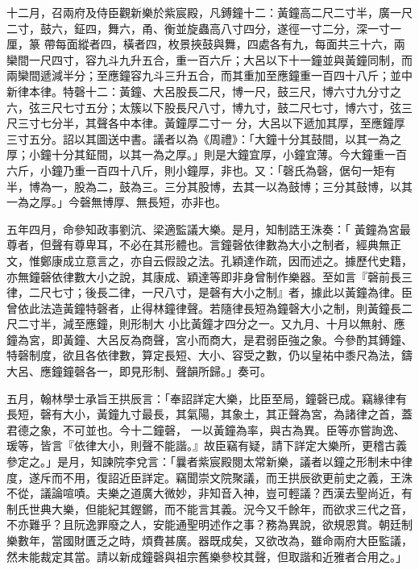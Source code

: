 \begin{pinyinscope}
 十二月，召兩府及侍臣觀新樂於紫宸殿，凡鎛鐘十二：黃鐘高二尺二寸半，廣一尺二寸，鼓六，鉦四，舞六，甬、衡並旋蟲高八寸四分，遂徑一寸二分，深一寸一厘，篆
 帶每面縱者四，橫者四，枚景挾鼓與舞，四處各有九，每面共三十六，兩欒間一尺四寸，容九斗九升五合，重一百六斤；大呂以下十一鐘並與黃鐘同制，而兩欒間遞減半分；至應鐘容九斗三升五合，而其重加至應鐘重一百四十八斤；並中新律本律。特磬十二：黃鐘、大呂股長二尺，博一尺，鼓三尺，博六寸九分寸之六，弦三尺七寸五分；太簇以下股長尺八寸，博九寸，鼓二尺七寸，博六寸，弦三尺三寸七分半，其聲各中本律。黃鐘厚二寸一
 分，大呂以下遞加其厚，至應鐘厚三寸五分。詔以其圖送中書。議者以為《周禮》：「大鐘十分其鼓間，以其一為之厚；小鐘十分其鉦間，以其一為之厚。」則是大鐘宜厚，小鐘宜薄。今大鐘重一百六斤，小鐘乃重一百四十八斤，則小鐘厚，非也。又：「磬氏為磬，倨句一矩有半，博為一，股為二，鼓為三。三分其股博，去其一以為鼓博；三分其鼓博，以其一為之厚。」今磬無博厚、無長短，亦非也。



 五年四月，命參知政事劉沆、梁適監議大樂。是月，知制誥王洙奏：「
 黃鐘為宮最尊者，但聲有尊卑耳，不必在其形體也。言鐘磬依律數為大小之制者，經典無正文，惟鄭康成立意言之，亦自云假設之法。孔穎達作疏，因而述之。據歷代史籍，亦無鐘磬依律數大小之說，其康成、穎達等即非身曾制作樂器。至如言『磬前長三律，二尺七寸；後長二律，一尺八寸，是磬有大小之制』者，據此以黃鐘為律。臣曾依此法造黃鐘特磬者，止得林鐘律聲。若隨律長短為鐘磬大小之制，則黃鐘長二尺二寸半，減至應鐘，則形制大
 小比黃鐘才四分之一。又九月、十月以無射、應鐘為宮，即黃鐘、大呂反為商聲，宮小而商大，是君弱臣強之象。今參酌其鎛鐘、特磬制度，欲且各依律數，算定長短、大小、容受之數，仍以皇祐中黍尺為法，鑄大呂、應鐘鐘磬各一，即見形制、聲韻所歸。」奏可。



 五月，翰林學士承旨王拱辰言：「奉詔詳定大樂，比臣至局，鐘磬已成。竊緣律有長短，磬有大小，黃鐘九寸最長，其氣陽，其象土，其正聲為宮，為諸律之首，蓋君德之象，不可並也。今十二鐘磬，
 一以黃鐘為率，與古為異。臣等亦嘗詢逸、瑗等，皆言『依律大小，則聲不能諧。』故臣竊有疑，請下詳定大樂所，更稽古義參定之。」是月，知諫院李兌言：「曩者紫宸殿閱太常新樂，議者以鐘之形制未中律度，遂斥而不用，復詔近臣詳定。竊聞崇文院聚議，而王拱辰欲更前史之義，王洙不從，議論喧嘖。夫樂之道廣大微妙，非知音入神，豈可輕議？西漢去聖尚近，有制氏世典大樂，但能紀其鏗鏘，而不能言其義。況今又千餘年，而欲求三代之音，
 不亦難乎？且阮逸罪廢之人，安能通聖明述作之事？務為異說，欲規恩賞。朝廷制樂數年，當國財匱乏之時，煩費甚廣。器既成矣，又欲改為，雖命兩府大臣監議，然未能裁定其當。請以新成鐘磬與祖宗舊樂參校其聲，但取諧和近雅者合用之。」




\end{pinyinscope}
